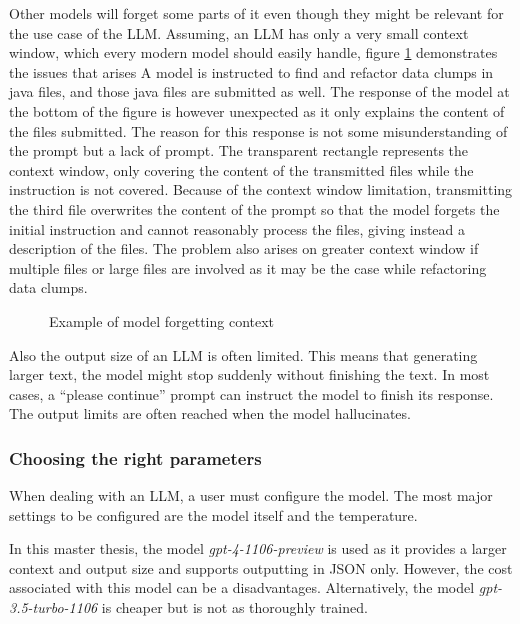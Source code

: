 Other models will forget some parts of it even though they might be relevant for the use case of the \ac{LLM}.
Assuming, an \ac{LLM} has only a very small context window, which every modern model should easily handle, figure \ref{fig:llm_loose_context} demonstrates the issues that arises  A model is instructed to find and refactor data clumps in java files, and those java files are submitted as well. The response of the model at the bottom of the figure is however unexpected as it only explains the content of the files submitted. The reason for this response is not some misunderstanding of the prompt but a lack of prompt. The transparent rectangle represents the context window, only covering the content of the transmitted files while the instruction is not covered. 
Because of the context window limitation, transmitting the third file overwrites the content of the prompt so that the model forgets the initial instruction and cannot reasonably process the files, giving instead a description of the files. The problem also arises on greater context window if multiple files or large files are involved as it may be the case while refactoring data clumps.

\begin{figure}[ht!]
    \centering
    
    \caption{Example of model forgetting context}
    \label{fig:llm_loose_context}
\end{figure}

Also the output size of an \ac{LLM} is often limited. This means that generating larger text, the model might stop suddenly without finishing the text. In most cases, a \enquote{please continue} prompt can instruct the model to finish its response. The output limits are often reached when the model hallucinates. 
\subsubsection{Choosing the right parameters}
When dealing with an \ac{LLM}, a user must configure the model. The most major settings to be configured are the model itself and the temperature.

In this master thesis, the model \textit{gpt-4-1106-preview} is used as it provides a larger context  and output size and supports outputting in \ac{JSON} only. However, the cost associated with this model can be a disadvantages. Alternatively, the model \textit{gpt-3.5-turbo-1106} is cheaper but is not as thoroughly trained. 

